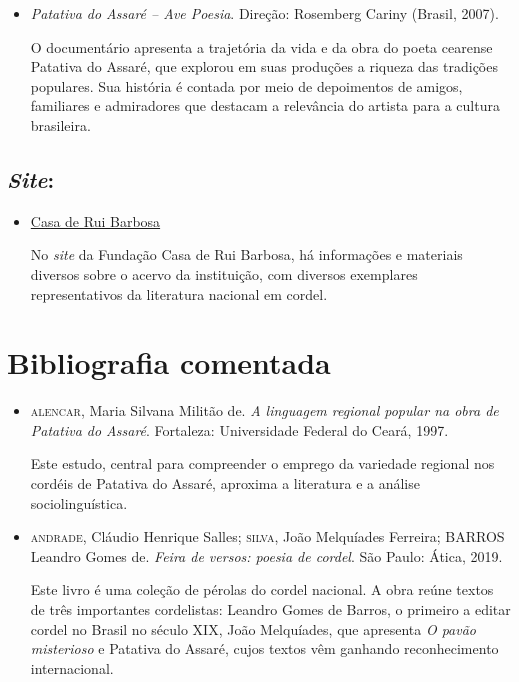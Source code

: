 \documentclass[12pt]{extarticle}
\begin{document}
{\begin{itemize}
\item \textit{Patativa do Assaré -- Ave Poesia}. Direção: Rosemberg Cariny
(Brasil, 2007).

O documentário apresenta a trajetória da vida e da obra do poeta
cearense Patativa do Assaré, que explorou em suas produções a riqueza das
tradições populares. Sua história é contada por meio de depoimentos de
amigos, familiares e admiradores que destacam a relevância do artista
para a cultura brasileira.

\end{itemize}

\subsection{\emph{Site}:}

\begin{itemize}

\item \href{http://www.casaruibarbosa.gov.br/cordel/acervo.html}{Casa de Rui Barbosa}

No \emph{site} da Fundação Casa de Rui Barbosa, há informações e
materiais diversos sobre o acervo da instituição, com diversos
exemplares representativos da literatura nacional em cordel.

\end{itemize}

\section{Bibliografia comentada}

\begin{itemize}

\item \textsc{alencar}, Maria Silvana Militão de. \textit{A linguagem regional
popular na obra de Patativa do Assaré}. Fortaleza: Universidade
Federal do Ceará, 1997.

Este estudo, central para compreender o emprego da variedade regional
nos cordéis de Patativa do Assaré, aproxima a literatura e a análise
sociolinguística.

\item \textsc{andrade}, Cláudio Henrique Salles; \textsc{silva}, João Melquíades Ferreira;
BARROS Leandro Gomes de. \textit{Feira de versos: poesia de cordel}.
São Paulo: Ática, 2019.

Este livro é uma coleção de pérolas do cordel nacional. A obra reúne
textos de três importantes cordelistas: Leandro Gomes de Barros, o
primeiro a editar cordel no Brasil no século XIX, João Melquíades, que
apresenta \emph{O pavão misterioso} e Patativa do Assaré, cujos textos
vêm ganhando reconhecimento internacional.


\end{itemize}}
\end{document}

